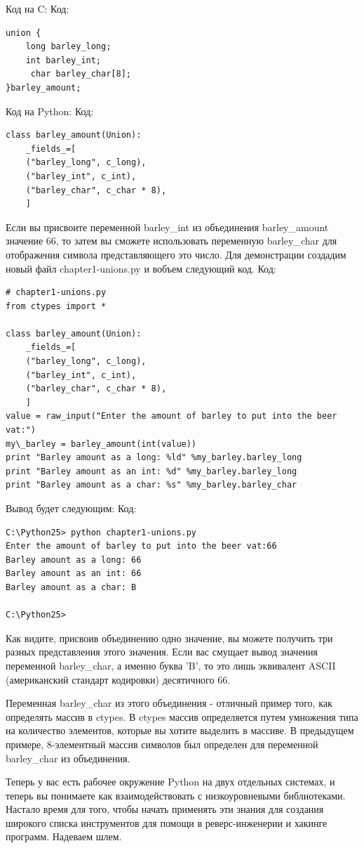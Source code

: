 \documentclass[12pt]{book}
\begin{document}
Код на C:
Код:
\begin{lstlisting}
union {
    long barley_long;
    int barley_int;
     char barley_char[8];
}barley_amount;
\end{lstlisting}
Код на Python:
Код:
\begin{lstlisting}
class barley_amount(Union):
    _fields_=[
    ("barley_long", c_long),
    ("barley_int", c_int),
    ("barley_char", c_char * 8),
    ]
\end{lstlisting}
Если вы присвоите переменной barley\_int из объединения barley\_amount значение 66, то затем вы сможете использовать переменную barley\_char для отображения символа представляющего это число. Для демонстрации создадим новый файл chapter1-unions.py и вобъем следующий код.
Код:
\begin{lstlisting}
# chapter1-unions.py
from ctypes import *

class barley_amount(Union):
    _fields_=[
    ("barley_long", c_long),
    ("barley_int", c_int),
    ("barley_char", c_char * 8),
    ]
value = raw_input("Enter the amount of barley to put into the beer vat:")
my\_barley = barley_amount(int(value))
print "Barley amount as a long: %ld" %my_barley.barley_long
print "Barley amount as an int: %d" %my_barley.barley_long
print "Barley amount as a char: %s" %my_barley.barley_char
\end{lstlisting}
Вывод будет следующим:
Код:
\begin{lstlisting}
C:\Python25> python chapter1-unions.py
Enter the amount of barley to put into the beer vat:66
Barley amount as a long: 66
Barley amount as an int: 66
Barley amount as a char: B

C:\Python25>
\end{lstlisting}
Как видите, присвоив объединению одно значение, вы можете получить три разных представления этого значения. Если вас смущает вывод значения переменной barley\_char, а именно буква 'B', то это лишь эквивалент ASCII (американский стандарт кодировки) десятичного 66.

Переменная barley\_char из этого объединения - отличный пример того, как определять массив в ctypes. В ctypes массив определяется путем умножения типа на количество элементов, которые вы хотите выделить в массиве. В предыдущем примере, 8-элементный массив символов был определен для переменной barley\_char из объединения.

Теперь у вас есть рабочее окружение Python на двух отдельных системах, и теперь вы понимаете как взаимодействовать с низкоуровневыми библиотеками. Настало время для того, чтобы начать применять эти знания для создания широкого списка инструментов для помощи в реверс-инженерии и хакинге программ. Надеваем шлем.
\end{document}
